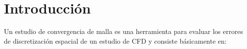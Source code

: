 \documentclass[11pt]{article}
\begin{document}





\section{Introducción}

Un estudio de convergencia de malla es una herramienta para evaluar los errores
de discretización espacial de un estudio de CFD y consiste básicamente en:
\end{document}
